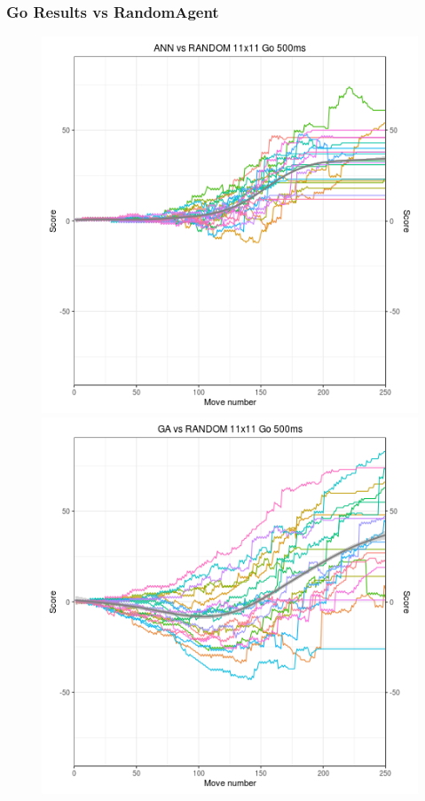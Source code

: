 \documentclass{beamer}
\begin{document}
\begin{frame}
\frametitle{Go Results vs RandomAgent}
\begin{figure}[h]
\centering
\begin{minipage}{.45\textwidth}
  \centering
  \includegraphics[scale=0.3]{images/annrand500go11.png}
\end{minipage}%
\begin{minipage}{.45\textwidth}
  \centering
  \includegraphics[scale=0.3]{images/garand500go11.png}
\end{minipage}
\label{fig:rand}
\end{figure}
\end{frame}
\end{document}
